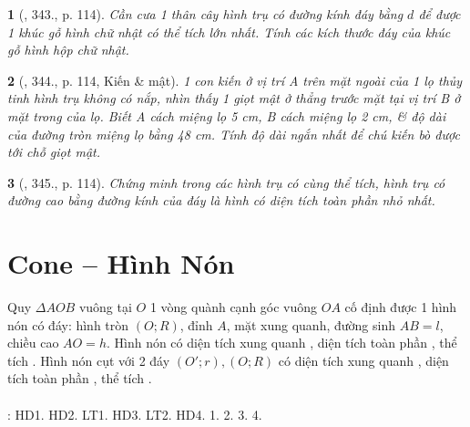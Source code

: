 \documentclass{article}
\newtheorem{baitoan}{}
\begin{document}
\begin{baitoan}[\cite{Binh_Toan_9_tap_2}, 343., p. 114]
	Cần cưa 1 thân cây hình trụ có đường kính đáy bằng $d$ để được 1 khúc gỗ hình chữ nhật có thể tích lớn nhất. Tính các kích thước đáy của khúc gỗ hình hộp chữ nhật.
\end{baitoan}

\begin{baitoan}[\cite{Binh_Toan_9_tap_2}, 344., p. 114, Kiến \& mật]
	1 con kiến ở vị trí A trên mặt ngoài của 1 lọ thủy tinh hình trụ không có nắp, nhìn thấy 1 giọt mật ở thẳng trước mặt tại vị trí B ở mặt trong của lọ. Biết A cách miệng lọ {\rm5 cm}, B cách miệng lọ {\rm2 cm}, \& độ dài của đường tròn miệng lọ bằng {\rm48 cm}. Tính độ dài ngắn nhất để chú kiến bò được tới chỗ giọt mật.
\end{baitoan}

\begin{baitoan}[\cite{Binh_Toan_9_tap_2}, 345., p. 114]
	Chứng minh trong các hình trụ có cùng thể tích, hình trụ có đường cao bằng đường kính của đáy là hình có diện tích toàn phần nhỏ nhất.
\end{baitoan}


\section{Cone -- Hình Nón}
\begin{center}
\end{center}
 Quy $\Delta AOB$ vuông tại $O$ 1 vòng quành cạnh góc vuông $OA$ cố định được 1 hình nón có đáy: hình tròn $(O;R)$, đỉnh $A$, mặt xung quanh, đường sinh $AB = l$, chiều cao $AO = h$.  Hình nón có diện tích xung quanh , diện tích toàn phần , thể tích .  Hình nón cụt với 2 đáy $(O';r),(O;R)$ có diện tích xung quanh , diện tích toàn phần , thể tích .\\
\\
\cite[Chap. X, \S2, pp. 98--103]{SGK_Toan_9_Canh_Dieu_tap_1}: HD1. HD2. LT1. HD3. LT2. HD4. 1. 2. 3. 4.
\end{document}
